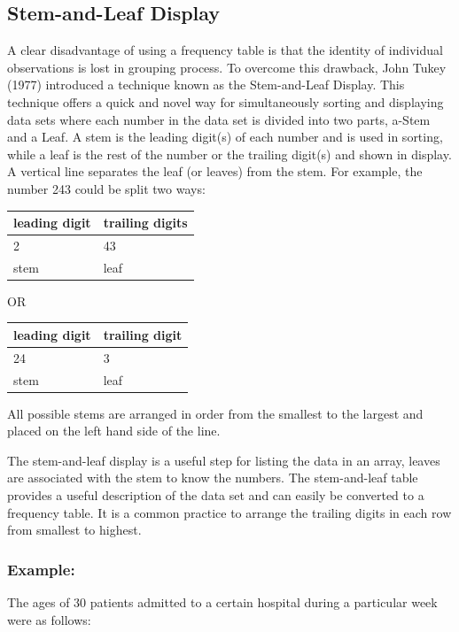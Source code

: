 \documentclass[]{article}
\begin{document}
\hypertarget{stem-and-leaf-display}{%
\subsection{Stem-and-Leaf Display}\label{stem-and-leaf-display}}

A clear disadvantage of using a frequency table is that the identity of
individual observations is lost in grouping process. To overcome this
drawback, John Tukey (1977) introduced a technique known as the
Stem-and-Leaf Display. This technique offers a quick and novel way for
simultaneously sorting and displaying data sets where each number in the
data set is divided into two parts, a-Stem and a Leaf. A stem is the
leading digit(s) of each number and is used in sorting, while a leaf is
the rest of the number or the trailing digit(s) and shown in display. A
vertical line separates the leaf (or leaves) from the stem. For example,
the number 243 could be split two ways:

\begin{longtable}[]{@{}ll@{}}
\toprule
leading digit & trailing digits\tabularnewline
\midrule
\endhead
2 & 43\tabularnewline
stem & leaf\tabularnewline
\bottomrule
\end{longtable}

OR

\begin{longtable}[]{@{}ll@{}}
\toprule
leading digit & trailing digit\tabularnewline
\midrule
\endhead
24 & 3\tabularnewline
stem & leaf\tabularnewline
\bottomrule
\end{longtable}

All possible stems are arranged in order from the smallest to the
largest and placed on the left hand side of the line.

The stem-and-leaf display is a useful step for listing the data in an
array, leaves are associated with the stem to know the numbers. The
stem-and-leaf table provides a useful description of the data set and
can easily be converted to a frequency table. It is a common practice to
arrange the trailing digits in each row from smallest to highest.

\hypertarget{example-2}{%
\subsubsection{Example:}\label{example-2}}

The ages of 30 patients admitted to a certain hospital during a
particular week were as follows:
\end{document}
